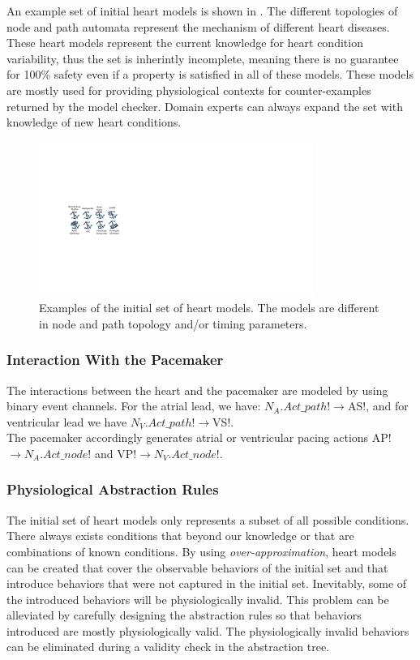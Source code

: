 An example set of initial heart models is shown in .
The different topologies of node and path automata represent the mechanism of different heart diseases.
These heart models represent the current knowledge for heart condition variability, thus the set is inherintly incomplete, meaning there is no guarantee for 100\% safety even if a property is satisfied in all of these models.
These models are mostly used for providing physiological contexts for counter-examples returned by the model checker.
Domain experts can always expand the set with knowledge of new heart conditions.
\begin{figure}[!h]
	\centering
	\includegraphics[width=0.8\textwidth]{figs/init.pdf}
	\caption{\small Examples of the initial set of heart models. The models are different in node and path topology and/or timing parameters.}
	\label{fig:init}
\end{figure}
\subsubsection{Interaction With the Pacemaker}
The interactions between the heart and the pacemaker are modeled by using binary event channels. For the atrial lead, we have:
\textsf{$N_A.Act\_path!\rightarrow$AS!},
and for ventricular lead we have
\textsf{$N_V.Act\_path!\rightarrow$VS!}.\\
The pacemaker accordingly generates atrial or ventricular pacing actions \textsf{AP!$\rightarrow N_A.Act\_node!$} and \textsf{VP!$\rightarrow N_V.Act\_node!$}.
\subsubsection{Physiological Abstraction Rules}
The initial set of heart models only represents a subset of all possible conditions.
There always exists conditions that beyond our knowledge or that are combinations of known conditions.
By using \emph{over-approximation}, heart models can be created that cover the observable behaviors of the initial set and that introduce behaviors that were not captured in the initial set.
Inevitably, some of the introduced behaviors will be physiologically invalid.
This problem can be alleviated by carefully designing the abstraction rules so that behaviors introduced are mostly physiologically valid.
The physiologically invalid behaviors can be eliminated during a validity check in the abstraction tree.

